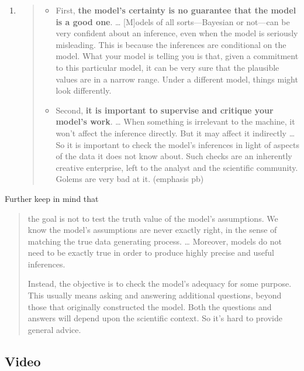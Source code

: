 \documentclass[
  letterpaper,
  DIV=11,
  numbers=noendperiod]{scrreprt}
\begin{document}
\begin{enumerate}
\def\labelenumi{\arabic{enumi}.}
\item
  \begin{quote}
  \begin{itemize}
  \item
    First, \textbf{the model's certainty is no guarantee that the model
    is a good one}. \ldots{} {[}M{]}odels of all sorts---Bayesian or
    not---can be very confident about an inference, even when the model
    is seriously misleading. This is because the inferences are
    conditional on the model. What your model is telling you is that,
    given a commitment to this particular model, it can be very sure
    that the plausible values are in a narrow range. Under a different
    model, things might look differently.
  \item
    Second, \textbf{it is important to supervise and critique your
    model's work}. \ldots{} When something is irrelevant to the machine,
    it won't affect the inference directly. But it may affect it
    indirectly \ldots{} So it is important to check the model's
    inferences in light of aspects of the data it does not know about.
    Such checks are an inherently creative enterprise, left to the
    analyst and the scientific community. Golems are very bad at it.
    (emphasis pb)
  \end{itemize}
  \end{quote}
\end{enumerate}

Further keep in mind that

\begin{quote}
the goal is not to test the truth value of the model's assumptions. We
know the model's assumptions are never exactly right, in the sense of
matching the true data generating process. \ldots{} Moreover, models do
not need to be exactly true in order to produce highly precise and
useful inferences.

Instead, the objective is to check the model's adequacy for some
purpose. This usually means asking and answering additional questions,
beyond those that originally constructed the model. Both the questions
and answers will depend upon the scientific context. So it's hard to
provide general advice.
\end{quote}

\hypertarget{video}{%
\subsection{Video}\label{video}}
\end{document}
